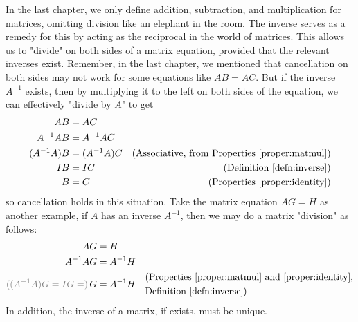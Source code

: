 In the last chapter, we only define addition, subtraction, and multiplication for matrices, omitting division like an elephant in the room. The inverse serves as a remedy for this by acting as the reciprocal in the world of matrices. This allows us to "divide" on both sides of a matrix equation, provided that the relevant inverses exist. Remember, in the last chapter, we mentioned that cancellation on both sides may not work for some equations like $AB = AC$. But if the inverse $A^{-1}$ exists, then by multiplying it to the left on both sides of the equation, we can effectively "divide by $A$" to get
\begin{align*}
AB &= AC \\
A^{-1}AB &= A^{-1}AC \\
(A^{-1}A)B &= (A^{-1}A)C & \text{(Associative, from Properties \ref{proper:matmul})} \\
IB &= IC & \text{(Definition \ref{defn:inverse})} \\
B &= C & \text{(Properties \ref{proper:identity})}
\end{align*}
so cancellation holds in this situation. Take the matrix equation $AG = H$ as another example, if $A$ has an inverse $A^{-1}$, then we may do a matrix "division" as follows:
\begin{align*}
AG &= H \\
A^{-1}AG &= A^{-1}H \\
\textcolor{gray}{((A^{-1}A)G = IG =)} \, G &= A^{-1}H & 
\begin{aligned}
& \text{(Properties \ref{proper:matmul} and \ref{proper:identity},} \\    
& \text{Definition \ref{defn:inverse})}
\end{aligned} 
\end{align*}
In addition, the inverse of a matrix, if exists, must be unique.
